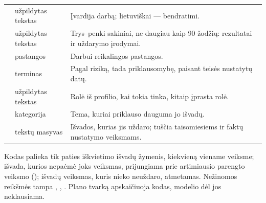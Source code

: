 \par\nopagebreak
\begin{xltabular}{\textwidth}{@{}L{38mm}L{22mm}Y@{}}
\toprule
{} &  &  \\
\midrule
\endhead
\bottomrule
\endlastfoot
{} & užpildytas tekstas & Įvardija darbą; lietuviškai --- bendratimi. \\
 & užpildytas tekstas & Trys--penki sakiniai, ne daugiau kaip 90 žodžių: rezultatai ir uždarymo įrodymai. \\
 & pastangos & Darbui reikalingos pastangos. \\
 & terminas & Pagal riziką, tada priklausomybę, paisant teisės nustatytų datų. \\
 & užpildytas tekstas & Rolė iš profilio, kai tokia tinka, kitaip įprasta rolė. \\
 & kategorija & Tema, kuriai priklauso dauguma jo išvadų. \\
 & tekstų masyvas & Išvados, kurias jis uždaro; tuščia taisomiesiems ir faktų nustatymo veiksmams. \\
\end{xltabular}

Kodas palieka tik paties iškvietimo išvadų žymenis, kiekvieną viename veiksme; išvada, kurios
nepaėmė joks veiksmas, prijungiama prie artimiausio parengto veiksmo ();
išvadų veiksmas, kuris nieko neuždaro, atmetamas. Nežinomos reikšmės tampa ,
, . Plano tvarką apskaičiuoja kodas, modelio dėl jos neklausiama.

